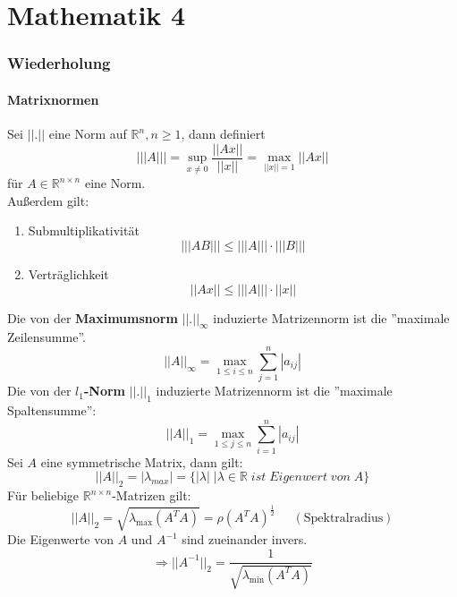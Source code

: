 \documentclass[a4paper,twocolumn,10pt]{article}
\begin{document}
\tableofcontents
\newpage

\part{Mathematik 4}

\section{Wiederholung}

\subsection{Matrixnormen}
Sei $||.||$ eine Norm auf $\mathbb{R}^n,n\geq 1$, dann definiert
\begin{equation*}
|||A|||=\sup\limits_{x\neq 0}\frac{||Ax||}{||x||}=\max\limits_{||x||=1}||Ax||
\end{equation*}
für $A\in\mathbb{R}^{n\times n}$ eine Norm.\\
Außerdem gilt:
\begin{enumerate}
\item Submultiplikativität
\begin{equation*}
|||AB|||\leq |||A|||\cdot |||B|||
\end{equation*}
\item Verträglichkeit
\begin{equation*}
||Ax||\leq |||A|||\cdot ||x||
\end{equation*}
\end{enumerate}
Die von der \textbf{Maximumsnorm} $||.||_{\infty}$ induzierte Matrizennorm ist die ''maximale Zeilensumme''.
\begin{equation*}
||A||_{\infty}=\max\limits_{1\leq i\leq n}\sum\limits_{j=1}^{n}|a_{ij}|
\end{equation*}
Die von der \textbf{$l_1$-Norm} $||.||_1$ induzierte Matrizennorm ist die ''maximale Spaltensumme'':
\begin{equation*}
||A||_1=\max\limits_{1\leq j\leq n}\sum\limits_{i=1}^{n}|a_{ij}|
\end{equation*}
Sei $A$ eine symmetrische Matrix, dann gilt:
\begin{equation*}
||A||_2 =|\lambda_{max}|=\{|\lambda|\;|\lambda\in\mathbb{R}\;ist\;Eigenwert\;von\;A\}
\end{equation*}
Für beliebige $\mathbb{R}^{n\times n}$-Matrizen gilt:
\begin{equation*}
||A||_2=\sqrt{\lambda_{\text{max}}(A^TA)}=\rho (A^TA)^{\frac{1}{2}}\;\;\;\;\;(\text{Spektralradius})
\end{equation*}
Die Eigenwerte von $A$ und $A^{-1}$ sind zueinander invers.
\begin{equation*}
\Rightarrow||A^{-1}||_2=\frac{1}{\sqrt{\lambda_{\text{min}}(A^TA)}}
\end{equation*}
\end{document}
